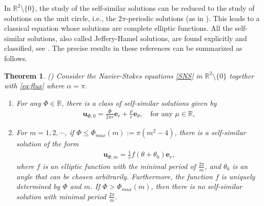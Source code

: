 \documentclass[reqno,12pt]{amsart}
\newtheorem{theorem}{Theorem}[section]
\newcommand{\Bu}{{\boldsymbol{u}}}
\newcommand{\Be}{{\boldsymbol{e}}}
\begin{document}
 In $\mathbb{R}^2\setminus \{0\}$, the study of the self-similar solutions can be reduced to the
  study of solutions on the unit circle, i.e., the 
  $2\pi$-periodic solutions (as in \cite{Sverak11, GuillodWittwer15SIAM}). This leads to a classical equation whose solutions are  complete elliptic functions. 
All the self-similar solutions, also called Jeffery-Hamel solutions,  are found explicitly and classified, see \cite{Hamel17, Jeffrey15, Sverak11}. The precise results in these references can be summarized as follows.
\begin{theorem}(\cite{Hamel17, Jeffrey15, Sverak11})  Consider the Navier-Stokes equations \eqref{SNS} in $\mathbb{R}^2\setminus \{0\}$  together with \eqref{eq:flux} where $\alpha=\pi$.   \begin{enumerate}
  \item   For any $\Phi\in \mathbb{R}$, there is a class 
 of self-similar solutions given by
    \begin{align*}
        \Bu_{\Phi,0}
        =\frac{\Phi}{2\pi r} \Be_r + \frac{\mu}{r} \Be_\theta,
        \quad \text{for any}\,\, \mu  \in \mathbb{R},
    \end{align*}
   
\item     For $m=1, 2, \cdots$, if $\Phi\leq \Phi_{max}(m):=\pi(m^2-4)$, there is a self-similar solution of the form
    \begin{align*}
        \Bu_{\Phi,m}
        =\frac{1}{r} f(\theta+\theta_0) \Be_r, 
    \end{align*}
where $f$ is an elliptic function with the minimal period of $\frac{2\pi}{m}$,   and  $\theta_0$ is an angle that can be chosen arbitrarily. Furthermore, the function $f$ is uniquely determined by $\Phi $ and $m$.  If $\Phi>\Phi_{max}(m)$, then there is no self-similar solution with minimal period $\frac{2\pi}{m}$. 

\end{enumerate}
\end{theorem}
  
\end{document}
